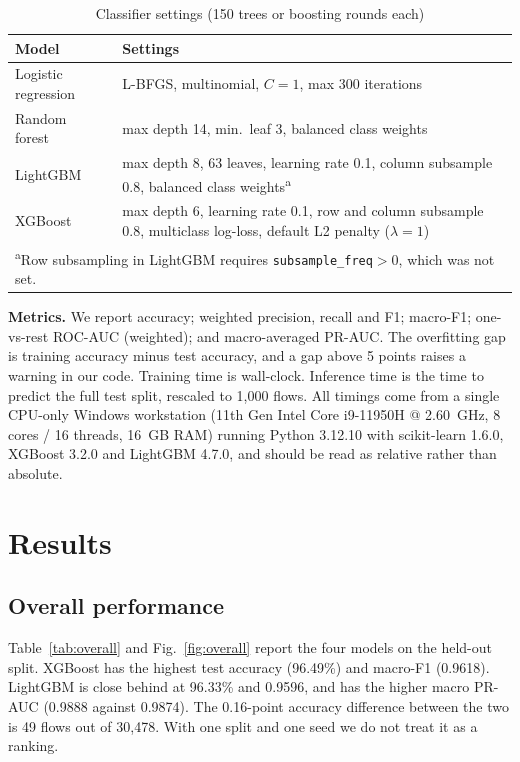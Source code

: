 \documentclass[journal]{IEEEtran}
\begin{document}
\begin{table}[!t]
\caption{Classifier settings (150 trees or boosting rounds each)}
\label{tab:hyper}
\centering
\footnotesize
\begin{tabular}{p{2.3cm}p{5.5cm}}
\toprule
Model & Settings\\
\midrule
Logistic regression & L-BFGS, multinomial, $C=1$, max 300 iterations\\
Random forest~\cite{breiman2001} & max depth 14, min.\ leaf 3, balanced class weights\\
LightGBM~\cite{ke2017} & max depth 8, 63 leaves, learning rate 0.1, column subsample 0.8, balanced class weights\textsuperscript{a}\\
XGBoost~\cite{chen2016} & max depth 6, learning rate 0.1, row and column subsample 0.8, multiclass log-loss, default L2 penalty ($\lambda=1$)\\
\bottomrule
\multicolumn{2}{l}{\scriptsize \textsuperscript{a}Row subsampling in LightGBM requires \texttt{subsample\_freq}$>0$, which was not set.}
\end{tabular}
\end{table}

\textbf{Metrics.} We report accuracy; weighted precision, recall and F1; macro-F1; one-vs-rest ROC-AUC (weighted); and macro-averaged PR-AUC. The overfitting gap is training accuracy minus test accuracy, and a gap above 5 points raises a warning in our code. Training time is wall-clock. Inference time is the time to predict the full test split, rescaled to 1,000 flows. All timings come from a single CPU-only Windows workstation (11th Gen Intel Core i9-11950H @ 2.60~GHz, 8 cores / 16 threads, 16~GB RAM) running Python 3.12.10 with scikit-learn 1.6.0, XGBoost 3.2.0 and LightGBM 4.7.0, and should be read as relative rather than absolute.

\section{Results}\label{sec:results}
\subsection{Overall performance}
Table~\ref{tab:overall} and Fig.~\ref{fig:overall} report the four models on the held-out split. XGBoost has the highest test accuracy (96.49\%) and macro-F1 (0.9618). LightGBM is close behind at 96.33\% and 0.9596, and has the higher macro PR-AUC (0.9888 against 0.9874). The 0.16-point accuracy difference between the two is 49 flows out of 30,478. With one split and one seed we do not treat it as a ranking.
\end{document}
